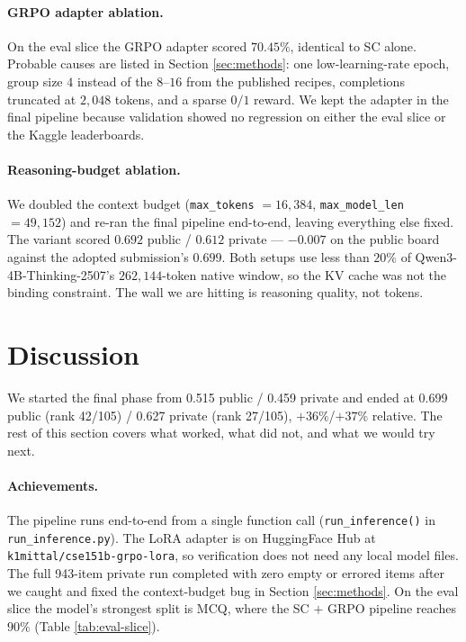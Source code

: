 \documentclass{article}
\begin{document}
\paragraph{GRPO adapter ablation.}
On the eval slice the GRPO adapter scored $70.45\%$, identical to
SC alone. Probable causes are listed in Section \ref{sec:methods}:
one low-learning-rate epoch, group size $4$ instead of the
$8$--$16$ from the published recipes, completions truncated at
$2{,}048$ tokens, and a sparse $0/1$ reward. We kept the adapter
in the final pipeline because validation showed no regression on
either the eval slice or the Kaggle leaderboards.

\paragraph{Reasoning-budget ablation.}
We doubled the context budget (\texttt{max\_tokens}
$=16{,}384$, \texttt{max\_model\_len} $=49{,}152$) and re-ran the
final pipeline end-to-end, leaving everything else fixed. The
variant scored $0.692$ public / $0.612$ private --- $-0.007$ on
the public board against the adopted submission's $0.699$. Both
setups use less than $20\%$ of Qwen3-4B-Thinking-2507's
$262{,}144$-token native window, so the KV cache was not the
binding constraint. The wall we are hitting is reasoning
quality, not tokens.


\section{Discussion}
\label{sec:discussion}
We started the final phase from 0.515 public / 0.459 private and
ended at 0.699 public (rank 42/105) / 0.627 private (rank 27/105),
$+36\%$/$+37\%$ relative. The rest of this section
covers what worked, what did not, and what we would try next.

\paragraph{Achievements.}
The pipeline runs end-to-end from a single function call
(\texttt{run\_inference()} in \texttt{run\_inference.py}). The
LoRA adapter is on HuggingFace Hub at
\texttt{k1mittal/cse151b-grpo-lora}, so verification does not
need any local model files. The full 943-item private run
completed with zero empty or errored items after we caught and
fixed the context-budget bug in Section \ref{sec:methods}. On the
eval slice the model's strongest split is MCQ, where the
SC $+$ GRPO pipeline reaches $90\%$ (Table \ref{tab:eval-slice}).
\end{document}

